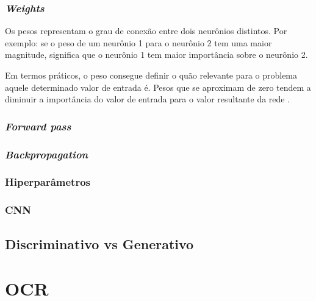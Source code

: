 \subsubsection{\textit{Weights}}

Os pesos representam o grau de conexão entre dois neurônios distintos. Por exemplo: se o peso de um neurônio 1 para o neurônio 2 tem uma maior magnitude, significa que o neurônio 1 tem maior importância sobre o neurônio 2.

Em termos práticos, o peso consegue definir o quão relevante para o problema aquele determinado valor de entrada é. Pesos que se aproximam de zero tendem a diminuir a importância do valor de entrada para o valor resultante da rede \cite{everything-about-nn}.

\subsubsection{\textit{Forward pass}}

\subsubsection{\textit{Backpropagation}}

\subsubsection{Hiperparâmetros}

\subsubsection{CNN}

\subsection{Discriminativo vs Generativo}

\section{OCR}
